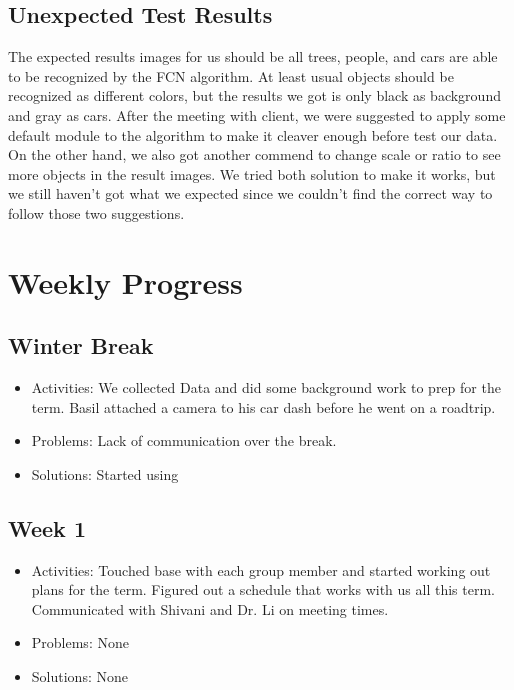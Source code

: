 \documentclass[10pt,draftclsnofoot,onecolumn,journal,compsoc]{IEEEtran}
\begin{document}
\subsection{Unexpected Test Results}
The expected results images for us should be all trees, people, and cars are able to be recognized by the FCN algorithm. 
At least usual objects should be recognized as different colors, but the results we got is only black as background and gray as cars.
After the meeting with client, we were suggested to apply some default module to the algorithm to make it cleaver enough before test our data.
On the other hand, we also got another commend to change scale or ratio to see more objects in the result images.
We tried both solution to make it works, but we still haven't got what we expected since we couldn't find the correct way to follow those two suggestions.









\section{Weekly Progress}

\subsection{Winter Break}
\begin{itemize}
\item Activities: 
We collected Data and did some background work to prep for the term. Basil attached a camera to his car dash before he went on a roadtrip.  
\item Problems: 
Lack of communication over the break.
\item Solutions: 
Started using
\end{itemize}

\subsection{Week 1}
\begin{itemize}
\item Activities: 
Touched base with each group member and started working out plans for the term. Figured out a schedule that works with us all this term. Communicated with Shivani and Dr. Li on meeting times. 
\item Problems: 
None
\item Solutions: 
None
\end{itemize}
\end{document}
